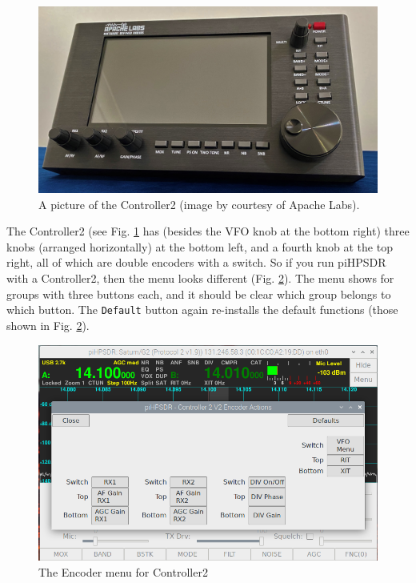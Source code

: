 \documentclass[12pt]{book}
\def\rett#1{\texttt{\color{red}#1}}
\begin{document}
\begin{figure}[ht!]
\center
\includegraphics[width=12cm]{Apache_Controller2.png}
\caption{A picture of the Controller2 (image by courtesy of Apache Labs).}
\label{fig:Apache_Controller2}
\end{figure}

The Controller2 (see Fig. \ref{fig:Apache_Controller2} 
has (besides the VFO knob at the bottom right) three knobs (arranged horizontally) at the bottom left,
and a fourth knob at the top right, all of which are double encoders with a switch.
So if you run piHPSDR with a Controller2, then the menu looks different (Fig. \ref{fig:EncoderMenuV2}).
 The menu shows
for groups with three buttons each, and it should be clear which group belongs to which button. The
\rett{Default} button again re-installs the default functions (those shown in Fig. \ref{fig:EncoderMenuV2}).

\begin{figure}[ht!]
\center
\includegraphics[width=12cm]{EncoderMenuV2.png}
\caption{The Encoder menu for Controller2}
\label{fig:EncoderMenuV2}
\end{figure}
\end{document}
